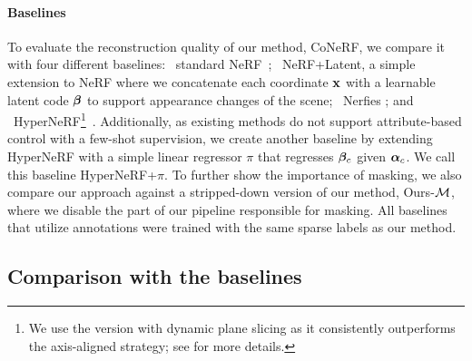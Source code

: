     \paragraph{Baselines}
      To evaluate the reconstruction quality of our method, CoNeRF, we compare it
      with four different baselines: ~standard
      NeRF~\cite{mildenhall2020nerf}; ~NeRF+Latent, a simple extension to
      NeRF where we concatenate each coordinate ${\mathbf{x}}$ with a learnable latent code
      ${\boldsymbol{\beta}}$ to support appearance changes of the scene; ~Nerfies
      \cite{park2020deformable}; and ~HyperNeRF\footnote{We use the
        version with dynamic plane slicing as it consistently outperforms the
        axis-aligned strategy; see \cite{park2021hypernerf} for more details.
      }~\cite{park2021hypernerf}.
      Additionally, as existing methods do not support attribute-based control with
      a few-shot supervision, we create another baseline  by extending
      HyperNeRF with a simple linear regressor $\pi$ that regresses ${\boldsymbol{\beta}}_c$ given
      ${\boldsymbol{\alpha}}_c$.
      We call this baseline HyperNeRF{+}$\pi$.
      To further show the importance of masking, we also compare our approach
      against a stripped-down version of our method, Ours{-}$\mathcal{M} $, where we
      disable the part of our pipeline responsible for masking.
      All baselines that utilize annotations were trained with the same sparse
      labels as our method.

  \subsection{Comparison with the baselines}
    

